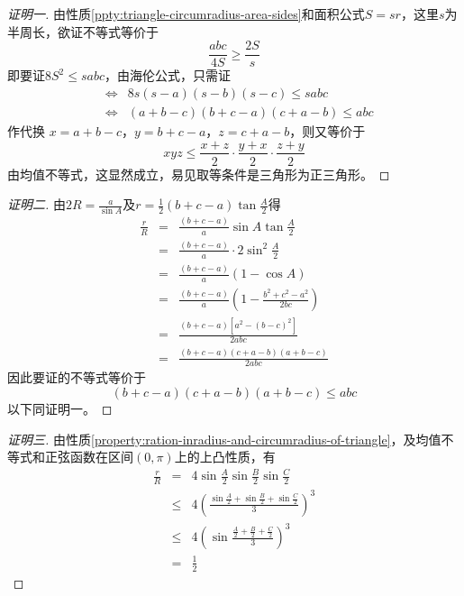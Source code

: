\begin{proof}[证明一]
  由性质\ref{ppty:triangle-circumradius-area-sides}和面积公式$S=sr$，这里$s$为半周长，欲证不等式等价于
  \begin{equation*}
    \frac{abc}{4S} \geqslant \frac{2S}{s}
  \end{equation*}
  即要证$8S^2 \leqslant sabc$，由海伦公式，只需证
  \begin{eqnarray*}
    & \Longleftrightarrow & 8s(s-a)(s-b)(s-c) \leqslant sabc \\
    & \Longleftrightarrow & (a+b-c)(b+c-a)(c+a-b) \leqslant abc
  \end{eqnarray*}
  作代换 $x=a+b-c$，$y=b+c-a$，$z=c+a-b$，则又等价于
  \begin{equation*}
    xyz \leqslant \frac{x+z}{2} \cdot \frac{y+x}{2} \cdot \frac{z+y}{2}
  \end{equation*}
  由均值不等式，这显然成立，易见取等条件是三角形为正三角形。
\end{proof}

\begin{proof}[证明二]
  由$2R=\frac{a}{\sin{A}}$及$r=\frac{1}{2}(b+c-a)\tan{\frac{A}{2}}$得
  \begin{eqnarray*}
    \frac{r}{R} & = & \frac{(b+c-a)}{a}\sin{A}\tan{\frac{A}{2}} \\
                & = & \frac{(b+c-a)}{a} \cdot 2\sin^2{\frac{A}{2}} \\
                & = & \frac{(b+c-a)}{a} (1-\cos{A}) \\
                & = & \frac{(b+c-a)}{a} \left( 1-\frac{b^2+c^2-a^2}{2bc} \right) \\
                & = & \frac{(b+c-a)[a^2-(b-c)^2]}{2abc} \\
    & = & \frac{(b+c-a)(c+a-b)(a+b-c)}{2abc}
  \end{eqnarray*}
  因此要证的不等式等价于
  \[
    (b+c-a)(c+a-b)(a+b-c) \leqslant abc
  \]
  以下同证明一。
\end{proof}

\begin{proof}[证明三]
  由性质\ref{property:ration-inradius-and-circumradius-of-triangle}，及均值不等式和正弦函数在区间$(0,\pi)$上的上凸性质，有
  \begin{eqnarray*}
    \frac{r}{R} & = & 4\sin{\frac{A}{2}}\sin{\frac{B}{2}}\sin{\frac{C}{2}} \\
                & \leqslant & 4 \left( \frac{\sin{\frac{A}{2}}+\sin{\frac{B}{2}}+\sin{\frac{C}{2}}}{3} \right)^3 \\
                & \leqslant & 4 \left( \sin{\frac{\frac{A}{2}+\frac{B}{2}+\frac{C}{2}}{3}} \right)^3 \\
    & = & \frac{1}{2}
  \end{eqnarray*}
\end{proof}


